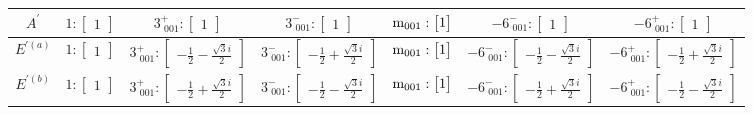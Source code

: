 \documentclass[fleqn,8pt,landscape]{jsarticle}
\begin{document}
\begin{longtable}{ccccccc}
$ A^{\prime} $ & $ 1:\begin{bmatrix} 1 \end{bmatrix} $ & $ 3^{+}_{\,\,001}:\begin{bmatrix} 1 \end{bmatrix} $ & $ 3^{-}_{\,\,001}:\begin{bmatrix} 1 \end{bmatrix} $ & $ {\rm m}_{001}:\begin{bmatrix} 1 \end{bmatrix} $ & $ -6^{-}_{\,\,001}:\begin{bmatrix} 1 \end{bmatrix} $ & $ -6^{+}_{\,\,001}:\begin{bmatrix} 1 \end{bmatrix} $ \\ \hline
$ E^{\prime(a)} $ & $ 1:\begin{bmatrix} 1 \end{bmatrix} $ & $ 3^{+}_{\,\,001}:\begin{bmatrix} - \frac{1}{2} - \frac{\sqrt{3} i}{2} \end{bmatrix} $ & $ 3^{-}_{\,\,001}:\begin{bmatrix} - \frac{1}{2} + \frac{\sqrt{3} i}{2} \end{bmatrix} $ & $ {\rm m}_{001}:\begin{bmatrix} 1 \end{bmatrix} $ & $ -6^{-}_{\,\,001}:\begin{bmatrix} - \frac{1}{2} - \frac{\sqrt{3} i}{2} \end{bmatrix} $ & $ -6^{+}_{\,\,001}:\begin{bmatrix} - \frac{1}{2} + \frac{\sqrt{3} i}{2} \end{bmatrix} $ \\ \hline
$ E^{\prime(b)} $ & $ 1:\begin{bmatrix} 1 \end{bmatrix} $ & $ 3^{+}_{\,\,001}:\begin{bmatrix} - \frac{1}{2} + \frac{\sqrt{3} i}{2} \end{bmatrix} $ & $ 3^{-}_{\,\,001}:\begin{bmatrix} - \frac{1}{2} - \frac{\sqrt{3} i}{2} \end{bmatrix} $ & $ {\rm m}_{001}:\begin{bmatrix} 1 \end{bmatrix} $ & $ -6^{-}_{\,\,001}:\begin{bmatrix} - \frac{1}{2} + \frac{\sqrt{3} i}{2} \end{bmatrix} $ & $ -6^{+}_{\,\,001}:\begin{bmatrix} - \frac{1}{2} - \frac{\sqrt{3} i}{2} \end{bmatrix} $ \\ \hline

\end{longtable}
\end{document}
